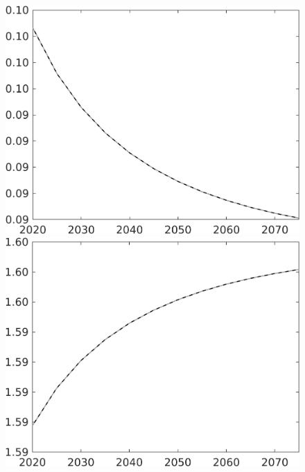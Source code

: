\documentclass[12pt]{article}
\begin{document}
\begin{figure}[h!!]
\begin{minipage}[]{0.32\textwidth}
	\end{minipage}	
	\begin{minipage}[]{0.32\textwidth}
		\includegraphics[width=1\textwidth]{../../codding_model/own_basedOnFried/optimalPol_010922_revision/figures/all_13Sept22/CompTaul_Equlab_LFBAU_Reg0_pee_spillover0_nsk1_xgr0_knspil0_sep1_countec0_GovRev0_etaa0.79_lgd0.png}
	\end{minipage}	
	\begin{minipage}[]{0.32\textwidth}
		\includegraphics[width=1\textwidth]{../../codding_model/own_basedOnFried/optimalPol_010922_revision/figures/all_13Sept22/CompTaul_Equlab_LFBAU_Reg0_pn_spillover0_nsk1_xgr0_knspil0_sep1_countec0_GovRev0_etaa0.79_lgd0.png}

\end{minipage}
\end{figure}
\end{document}

